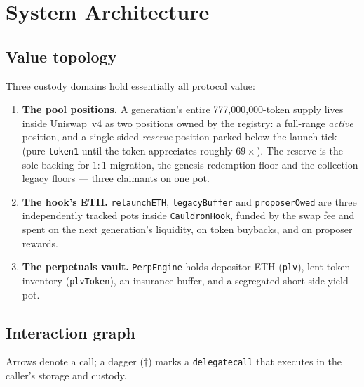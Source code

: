 \documentclass[10pt,a4paper]{article}
\newcommand{\code}[1]{\texttt{\small #1}}
\begin{document}
\section{System Architecture}\label{sec:arch}

\subsection{Value topology}
Three custody domains hold essentially all protocol value:

\begin{enumerate}[leftmargin=1.5em]
\item \textbf{The pool positions.} A generation's entire 777{,}000{,}000-token supply
lives inside Uniswap~v4 as two positions owned by the registry: a full-range
\emph{active} position, and a single-sided \emph{reserve} position parked below the
launch tick (pure \code{token1} until the token appreciates roughly $69\times$). The
reserve is the sole backing for $1{:}1$ migration, the genesis redemption floor and the
collection legacy floors --- three claimants on one pot.
\item \textbf{The hook's ETH.} \code{relaunchETH}, \code{legacyBuffer} and
\code{proposerOwed} are three independently tracked pots inside \code{CauldronHook},
funded by the swap fee and spent on the next generation's liquidity, on token buybacks,
and on proposer rewards.
\item \textbf{The perpetuals vault.} \code{PerpEngine} holds depositor ETH
(\code{plv}), lent token inventory (\code{plvToken}), an insurance buffer, and a
segregated short-side yield pot.
\end{enumerate}

\subsection{Interaction graph}
Arrows denote a call; a dagger ($\dagger$) marks a \code{delegatecall} that executes in
the caller's storage and custody.
\end{document}
